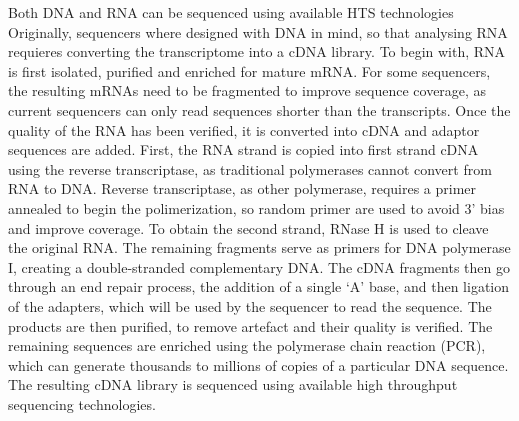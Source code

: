 Both DNA and RNA can be sequenced using available HTS technologies
Originally, sequencers where designed with DNA in mind, so that analysing RNA requieres converting the transcriptome into a cDNA library\cite{RNAseqlopedia, truseq}.
To begin with, RNA is first isolated, purified and enriched for mature mRNA.  
For some sequencers, the resulting mRNAs need to be fragmented to improve sequence coverage, as current sequencers can only read sequences shorter than the transcripts. 
Once the quality of the RNA has been verified, it is converted into cDNA and adaptor sequences are added. 
First, the RNA strand is copied into first strand cDNA using the reverse transcriptase, as traditional polymerases cannot convert from RNA to DNA\cite{alberts2014molecular}.
Reverse transcriptase, as other polymerase, requires a primer annealed to begin the polimerization, so random primer are used to avoid 3' bias and improve coverage\cite{RNAseqlopedia, truseq}.
To obtain the second strand, RNase H is used to cleave the original RNA. 
The remaining fragments serve as primers for DNA polymerase I, creating a double-stranded complementary DNA. 
The cDNA fragments then go through an end repair process, the addition of a single ‘A’ base, and then ligation of the adapters, which will be used by the sequencer to read the sequence. 
The products are then purified, to remove artefact and their quality is verified\cite{RNAseqlopedia, truseq}.
The remaining sequences are enriched using the polymerase chain reaction (PCR),  which can generate thousands to millions of copies of a particular DNA sequence\cite{RNAseqlopedia, truseq}.
The resulting cDNA library is sequenced using available high throughput sequencing technologies. 


